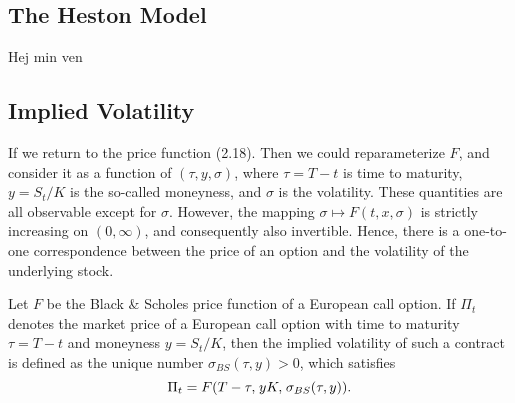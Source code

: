 \subsection{The Heston Model}
Hej min ven

\subsection{Implied Volatility}
If we return to the price function (2.18). Then we could reparameterize $F$, and consider it as a function of $(\tau, y, \sigma)$, where $\tau=T-t$ is time to maturity, $y=S_{t}/K$ is the so-called moneyness, and $\sigma$ is the volatility. These quantities are all observable except for $\sigma$. However, the mapping $\sigma\mapsto F(t,x,\sigma)$ is strictly increasing on $(0,\infty)$, and consequently also invertible. Hence, there is a one-to-one correspondence between the price of an option and the volatility of the underlying stock. 
\begin{defn}
    Let $F$ be the Black \& Scholes price function of a European call option. If $\Pi_{t}$ denotes the market price of a European call option with time to maturity $\tau=T-t$ and moneyness $y=S_{t}/K$, then the implied volatility of such a contract is defined as the unique number $\sigma_{BS}(\tau, y)>0$, which satisfies
    \begin{equation}
        \Pi_{t}=F\left(T-\tau, \hspace{1 pt}yK,\hspace{1 pt}\sigma_{BS}(\tau,y)\right).
    \end{equation}
\end{defn}
